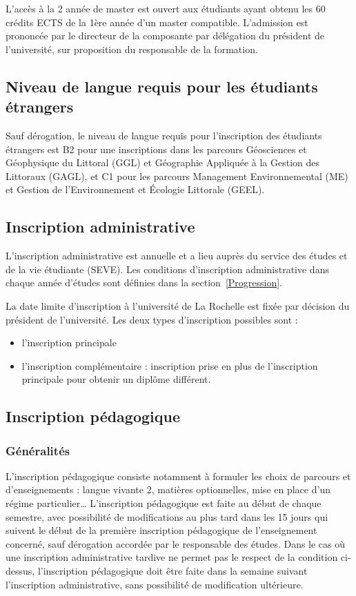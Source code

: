 \documentclass[a4paper,11pt]{article}
\begin{document}
L'accès à la 2\ieme{} année de master est ouvert aux étudiants ayant obtenu les 60 crédits ECTS de la 1ère année d'un master compatible. L'admission est prononcée par le directeur de la composante par délégation du président de l'université, sur proposition du responsable de la formation.


\subsection{Niveau de langue requis pour les étudiants étrangers}\label{langue}
Sauf dérogation, le niveau de langue requis pour l'inscription des étudiants étrangers est B2 pour une inscriptions dans les parcours Géosciences et Géophysique du Littoral (GGL) et Géographie Appliquée à la Gestion des Littoraux (GAGL), et C1 pour les parcours Management Environnemental (ME) et Gestion de l'Environnement et Écologie Littorale (GEEL).

\subsection{Inscription administrative}\label{InsciprtionAdministrative}

L'inscription administrative est annuelle et a lieu auprès du service des études et de la vie étudiante (SEVE). Les conditions d'inscription administrative dans chaque année d'études sont définies dans la section~\ref{Progression}.

La date limite d'inscription à l'université de La Rochelle est fixée par décision du président de l'université.
Les deux types d'inscription possibles sont :
\begin{itemize}
\item l'inscription principale
\item l'inscription complémentaire : inscription prise en plus de l'inscription principale pour obtenir un diplôme différent.
\end{itemize}


\subsection{Inscription pédagogique}\label{InscriptionPeda}

\subsubsection{Généralités}

L'inscription pédagogique consiste notamment à formuler les choix de parcours et d'enseignements : langue vivante 2, matières optionnelles, mise en place d'un régime particulier\ldots{} 
L'inscription pédagogique est faite au début de chaque semestre, avec possibilité de modifications au plus tard dans les 15 jours qui suivent le début de la première inscription pédagogique de l'enseignement concerné, sauf dérogation accordée par le responsable des études.
Dans le cas où une inscription administrative tardive ne permet pas le respect de la condition ci-dessus, l'inscription pédagogique doit être faite dans la semaine suivant l'inscription administrative, sans possibilité de modification ultérieure.
\end{document}
